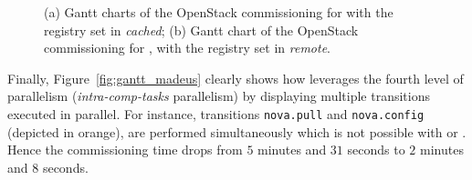\begin{figure}[t]
	\begin{center}
		\def\svgwidth{\columnwidth}
		\tiny
		\def\svgwidth{\columnwidth}
		\tiny
		\caption{(a) Gantt charts of the OpenStack
			commissioning for \madass with the
			registry set in \emph{cached}; (b) Gantt chart of the OpenStack
			commissioning for \madass, with the registry set in
			\emph{remote}.}
		\label{}
	\end{center}
\end{figure}

Finally, Figure~\ref{fig:gantt_madeus} clearly shows how \mad
leverages the fourth level of parallelism (\ie \emph{intra-comp-tasks}
parallelism) by displaying multiple transitions executed in
parallel. For instance, transitions \texttt{nova.pull} and
\texttt{nova.config} (depicted in orange), are performed
simultaneously which is not possible with \ansible or \aeolus. Hence
the commissioning time drops from $5$ minutes and $31$ seconds to $2$
minutes and $8$ seconds.
%

